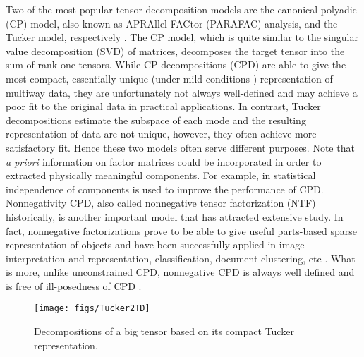 \documentclass[10pt,twocolumn,twoside]{IEEEtran}
\newcommand{\apriori}{{\it{a priori }}}
\begin{document}
Two of the most popular tensor decomposition models are the canonical polyadic (CP) model, also known as APRAllel FACtor (PARAFAC) analysis, and the Tucker model, respectively \cite{Kolda09tensordecompositions}. The CP model, which is quite similar to the singular value decomposition (SVD) of matrices, decomposes the target tensor into the sum of rank-one tensors.  While CP decompositions (CPD) are able to give the most compact, essentially unique (under mild conditions \cite{Sidiropoulos2000}) representation of multiway data, they are unfortunately not always well-defined and may achieve a poor fit to the original data in practical applications. In contrast, Tucker decompositions estimate the subspace of each mode and the resulting representation of data are not unique, however, they often achieve more satisfactory fit. Hence these two models often serve different purposes.  Note that \apriori information on factor matrices could be incorporated in order to extracted physically meaningful components. For example, in \cite{SPL-SMBSS} statistical independence of components is used to improve the performance of CPD. Nonnegativity CPD, also called nonnegative tensor factorization (NTF) historically, is another important model that has attracted extensive study. In fact, nonnegative factorizations prove to be able to give useful parts-based sparse representation of objects and have been successfully applied in image interpretation and representation, classification, document clustering, etc \cite{nmfbookCA}. What is more, unlike unconstrained CPD, nonnegative CPD is always well defined and is free of ill-posedness of CPD \cite{NTFComon2009}.  

 \begin{figure}[!t]
\centerline{
    \texttt{[image: figs/Tucker2TD]}
}
\caption{Decompositions of a big tensor based on its compact Tucker representation.}
\label{fig:Tucker2AllTD}
\end{figure}
\end{document}
